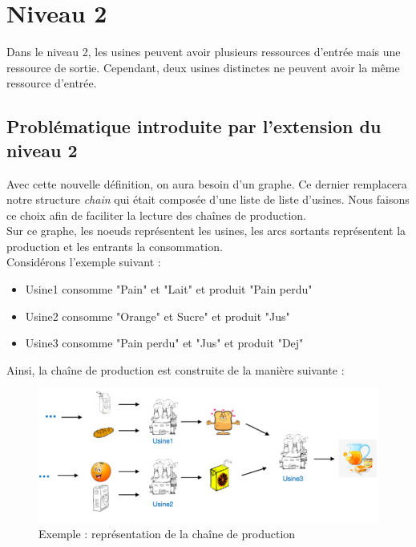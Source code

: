\section{Niveau 2}

Dans le niveau 2, les usines peuvent avoir plusieurs ressources d'entrée mais une ressource de sortie. Cependant, deux usines distinctes ne peuvent avoir la même ressource d'entrée. 

\subsection{Problématique introduite par l'extension du niveau 2}

Avec cette nouvelle définition, on aura besoin d'un graphe. Ce dernier remplacera notre structure \textit{chain} qui était composée d'une liste de liste d'usines. Nous faisons ce choix afin de faciliter la lecture des chaînes de production.\\
\indent Sur ce graphe, les noeuds représentent les usines, les arcs sortants représentent la production et les entrants la consommation.\\
\smallbreak
\indent Considérons l'exemple suivant : 
\begin{itemize}
    \item Usine1 consomme "Pain" et  "Lait" et produit "Pain perdu"
    \item Usine2 consomme "Orange" et Sucre" et produit "Jus"
    \item Usine3 consomme "Pain perdu" et "Jus" et produit "Dej"
\end{itemize}

\indent Ainsi, la chaîne de production est construite de la manière suivante :

\begin{figure}[H]
		\centering
		\includegraphics[scale=0.35]{factory_niveau2.png}
    	\caption{Exemple : représentation de la chaîne de production }
    \end{figure}

